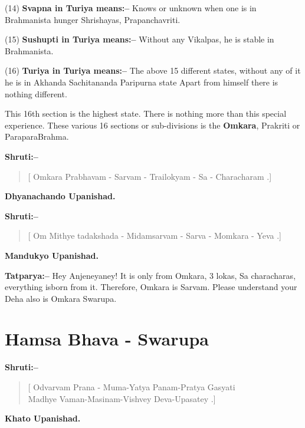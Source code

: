 (14) \textbf{Svapna in Turiya means:–} Knows or unknown when one is in Brahmanista hunger Shrishayas, Prapanchavriti.

(15) \textbf{Sushupti in Turiya means:–} Without any Vikalpas, he is stable in Brahmanista.

(16) \textbf{Turiya in Turiya means:–} The above 15 different states, without any of it he is in Akhanda Sachitananda Paripurna state Apart from himself there is nothing different.

This 16th section is the highest state. There is nothing more than this special experience. These various 16 sections or sub-divisions is the \textbf{Omkara}, Prakriti or ParaparaBrahma.

\textbf{Shruti:–}

\begin{verse}
[ Omkara Prabhavam - Sarvam - Trailokyam - Sa - Characharam .]
\end{verse}

\begin{flushright}
\textbf{Dhyanachando Upanishad.}
\end{flushright}

\textbf{Shruti:–}

\begin{verse}
[ Om Mithye tadakshada - Midamsarvam - Sarva - Momkara - Yeva .]
\end{verse}

\begin{flushright}
\textbf{Mandukyo Upanishad.}
\end{flushright}

\textbf{Tatparya:–} Hey Anjeneyaney! It is only from Omkara, 3 lokas, Sa characharas, everything isborn from it. Therefore, Omkara is Sarvam. Please understand your Deha also is Omkara Swarupa.

\chapter{Hamsa Bhava - Swarupa}

\textbf{Shruti:–}

\begin{verse}
[ Odvarvam Prana - Muma-Yatya Panam-Pratya Gasyati \\ Madhye Vaman-Masinam-Vishvey Deva-Upasatey .]
\end{verse}

\begin{flushright}
\textbf{Khato Upanishad.}
\end{flushright}


